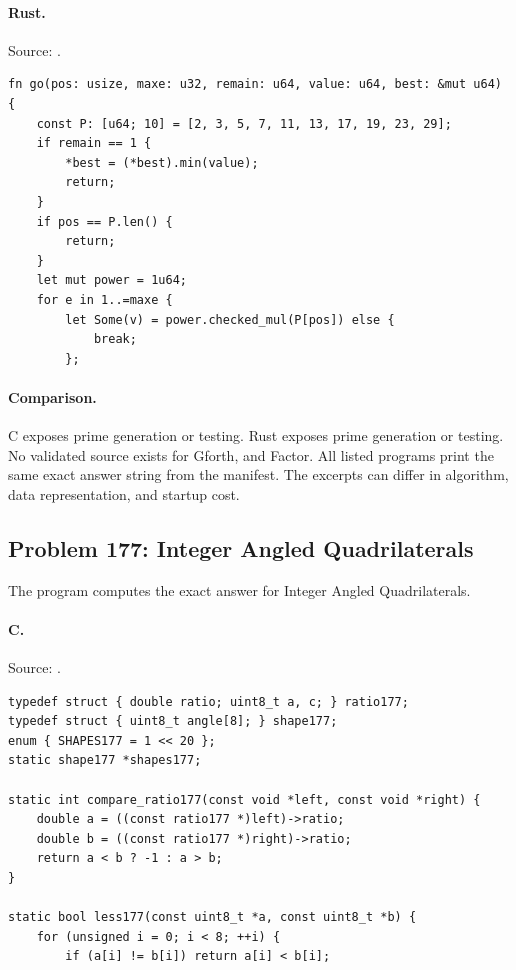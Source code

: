 \paragraph{Rust.} Source: .
\begin{lstlisting}
fn go(pos: usize, maxe: u32, remain: u64, value: u64, best: &mut u64) {
    const P: [u64; 10] = [2, 3, 5, 7, 11, 13, 17, 19, 23, 29];
    if remain == 1 {
        *best = (*best).min(value);
        return;
    }
    if pos == P.len() {
        return;
    }
    let mut power = 1u64;
    for e in 1..=maxe {
        let Some(v) = power.checked_mul(P[pos]) else {
            break;
        };
\end{lstlisting}

\paragraph{Comparison.}
C exposes prime generation or testing. Rust exposes prime generation or testing.
No validated source exists for Gforth, and Factor.
All listed programs print the same exact answer string from the manifest. The excerpts can differ in algorithm, data representation, and startup cost.

\subsection{Problem 177: Integer Angled Quadrilaterals}
\label{walkthrough:p177}
The program computes the exact answer for Integer Angled Quadrilaterals.

\paragraph{C.} Source: .
\begin{lstlisting}
typedef struct { double ratio; uint8_t a, c; } ratio177;
typedef struct { uint8_t angle[8]; } shape177;
enum { SHAPES177 = 1 << 20 };
static shape177 *shapes177;

static int compare_ratio177(const void *left, const void *right) {
    double a = ((const ratio177 *)left)->ratio;
    double b = ((const ratio177 *)right)->ratio;
    return a < b ? -1 : a > b;
}

static bool less177(const uint8_t *a, const uint8_t *b) {
    for (unsigned i = 0; i < 8; ++i) {
        if (a[i] != b[i]) return a[i] < b[i];
\end{lstlisting}

